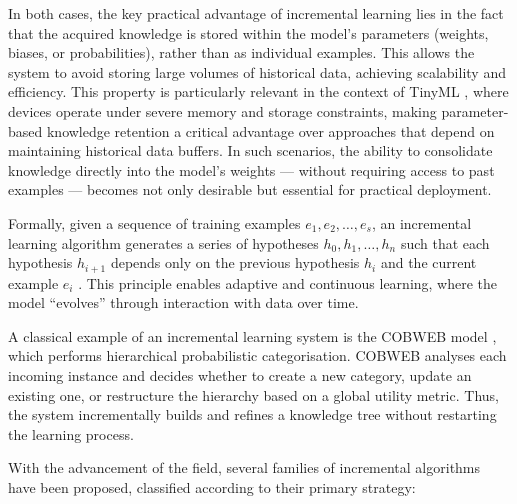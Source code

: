 In both cases, the key practical advantage of incremental learning lies in the fact that 
the acquired knowledge is stored within the model's parameters (weights, biases, or 
probabilities), rather than as individual examples. This allows the system to avoid 
storing large volumes of historical data, achieving scalability and efficiency. This 
property is particularly relevant in the context of TinyML \cite{warden2019tinyml}, where 
devices operate under severe memory and storage constraints, making parameter-based 
knowledge retention a critical advantage over approaches that depend on maintaining 
historical data buffers. In such scenarios, the ability to consolidate knowledge directly 
into the model's weights --- without requiring access to past examples --- becomes not 
only desirable but essential for practical deployment.

Formally, given a sequence of training examples \(e_1, e_2, \dots, e_s\), an incremental learning algorithm generates a series of hypotheses \(h_0, h_1, \dots, h_n\) such that each hypothesis \(h_{i+1}\) depends only on the previous hypothesis \(h_i\) and the current example \(e_i\) \cite{GiraudCarrier2000}.  
This principle enables adaptive and continuous learning, where the model “evolves” through interaction with data over time.

A classical example of an incremental learning system is the COBWEB model \cite{fisher1987}, which performs hierarchical probabilistic categorisation.  
COBWEB analyses each incoming instance and decides whether to create a new category, update an existing one, or restructure the hierarchy based on a global utility metric.  
Thus, the system incrementally builds and refines a knowledge tree without restarting the learning process.

With the advancement of the field, several families of incremental algorithms have been proposed, classified according to their primary strategy:

